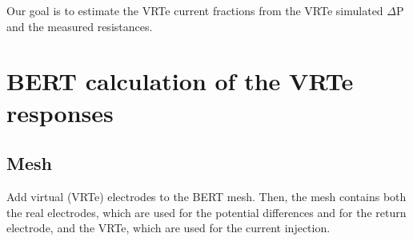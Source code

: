 \documentclass{article}
\begin{document}
Our goal is to estimate the VRTe current fractions from the VRTe simulated $\Delta$P and the measured resistances.

\section{BERT calculation of the VRTe responses}

\subsection{Mesh}

Add virtual (VRTe) electrodes to the BERT mesh. Then, the mesh contains both the real electrodes, which are used for the potential differences and for the return electrode, and the VRTe, which are used for the current injection.
\end{document}
